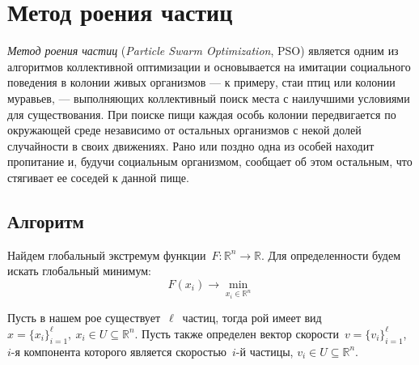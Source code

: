 \chapter{Метод роения частиц} \label{ParticleSwarmOptimisation}
\noindent
\emph{Метод роения частиц} (\emph{Particle Swarm Optimization}, PSO) является одним из алгоритмов коллективной оптимизации и основывается на имитации социального поведения в колонии живых организмов --- к примеру, стаи птиц или колонии муравьев, --- выполняющих коллективный поиск места с наилучшими условиями для существования. При поиске пищи каждая особь колонии передвигается по окружающей среде независимо от остальных организмов с некой долей случайности в своих движениях. Рано или поздно одна из особей находит пропитание и, будучи социальным организмом, сообщает об этом остальным, что стягивает ее соседей к данной пище.

\section{Алгоритм}
\noindent
Найдем глобальный экстремум функции~$F \colon \mathbb{R}^{n} \to \mathbb{R}$. Для определенности будем искать глобальный минимум:
\[
	F(x_i) \to \min \limits _{x_i \in \mathbb{R}^{n}}
\]

Пусть в нашем рое существует~$\ell$~частиц, тогда рой имеет вид~$x = \{x_i\}_{i = 1}^{\ell}, \ x_i \in U \subseteq \mathbb{R}^n$. Пусть также определен вектор скорости~$v = \{v_i\}_{i=1}^{\ell}$,~$i$-я компонента которого является скоростью~$i$-й частицы, $v_i \in U \subseteq \mathbb{R}^n$.

